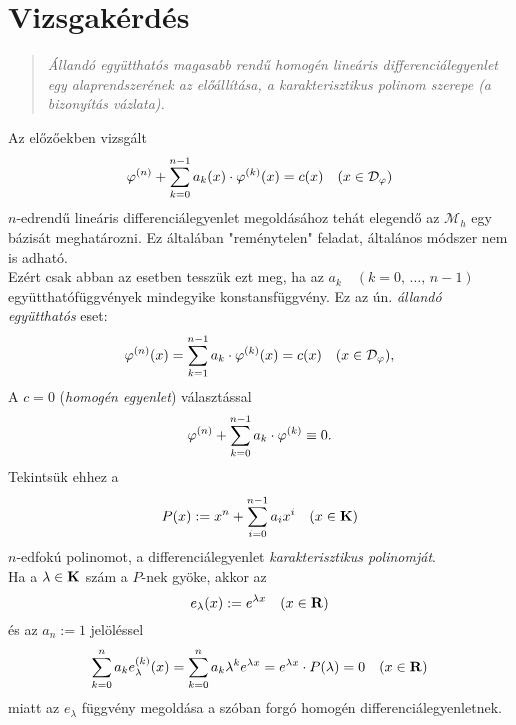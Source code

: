 \newpage
\section{Vizsgakérdés}
\begin{quote}
	\textit{Állandó együtthatós magasabb rendű homogén lineáris differenciálegyenlet egy alaprendszerének az előállítása, a karakterisztikus polinom szerepe (a bizonyítás vázlata).}
\end{quote}

Az előzőekben vizsgált
\[
	\varphi^{(n)} + \sum_{k=0}^{n-1} a_k(x) \cdot \varphi^{(k)}(x) = c(x) \quad (x \in \mathcal{D}_\varphi)
\]
$n$-edrendű lineáris differenciálegyenlet megoldásához tehát elegendő az $\mathcal{M}_h$ egy bázisát meghatározni. Ez általában "reménytelen" feladat, általános módszer nem is adható.\\

Ezért csak abban az esetben tesszük ezt meg, ha az $a_k \quad (k = 0, \, \dots, \, n-1)$ együtthatófüggvények mindegyike konstansfüggvény. Ez az ún. \textit{állandó együtthatós} eset:
\[
	\varphi^{(n)}(x) = \sum_{k=1}^{n-1} a_k \cdot \varphi^{(k)}(x) = c(x) \quad (x \in \mathcal{D}_\varphi),
\]
A $c=0$ (\textit{homogén egyenlet}) választással
\[
	\varphi^{(n)} + \sum_{k=0}^{n-1} a_k \cdot \varphi^{(k)} \equiv 0.
\]
Tekintsük ehhez a
\[
	P(x) := x^n + \sum_{i=0}^{n-1} a_i x^i \quad (x \in \mathbf{K})
\]
$n$-edfokú polinomot, a differenciálegyenlet \textit{karakterisztikus polinomját}.\\

Ha a $\lambda \in \mathbf{K}$ szám a $P$-nek gyöke, akkor az
\[
	e_\lambda(x) := e^{\lambda x} \quad (x \in \mathbf{R})
\]
és az $a_n := 1$ jelöléssel
\[
	\sum_{k=0}^n a_k e_\lambda^{(k)}(x) = \sum_{k=0}^n a_k \lambda^k e^{\lambda x} = e^{\lambda x} \cdot P(\lambda) = 0 \quad (x \in \mathbf{R})
\]
miatt az $e_\lambda$ függvény megoldása a szóban forgó homogén differenciálegyenletnek.\\

